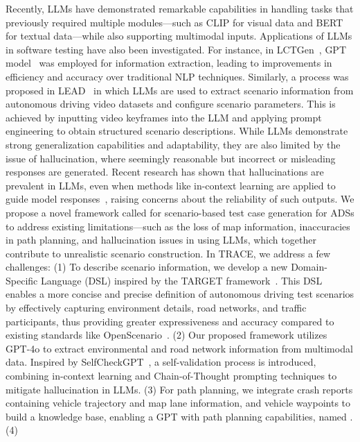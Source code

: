 Recently, LLMs have demonstrated remarkable capabilities in handling tasks that previously required multiple modules—such as CLIP for visual data and BERT for textual data—while also supporting multimodal inputs. Applications of LLMs in software testing have also been investigated. For instance, in LCTGen~\cite{tan2023language}, GPT model~\cite{brown2020language} was employed for information extraction, leading to improvements in efficiency and accuracy over traditional NLP techniques. Similarly, a process was proposed in LEAD~\cite{tian2024llm} in which LLMs are used to extract scenario information from autonomous driving video datasets and configure scenario parameters. This is achieved by inputting video keyframes into the LLM and applying prompt engineering to obtain structured scenario descriptions. While LLMs demonstrate strong generalization capabilities and adaptability, they are also limited by the issue of hallucination, where seemingly reasonable but incorrect or misleading responses are generated. Recent research has shown that hallucinations are prevalent in LLMs, even when methods like in-context learning are applied to guide model responses~\cite{huang2023survey}, raising concerns about the reliability of such outputs.
We propose a novel framework called \textbf{{\tool}} for scenario-based test case generation for ADSs to address existing limitations—such as the loss of map information, inaccuracies in path planning, and hallucination issues in using LLMs, which together contribute to unrealistic scenario construction.
In TRACE, we address a few challenges: (1) To describe scenario information, we develop a new Domain-Specific Language (DSL) inspired by the TARGET framework~\cite{deng2023targetautomatedscenariogeneration}. This DSL enables a more concise and precise definition of autonomous driving test scenarios by effectively capturing environment details, road networks, and traffic participants, thus providing greater expressiveness and accuracy compared to existing standards like OpenScenario~\cite{ASAM2021}. (2) Our proposed framework utilizes GPT-4o to extract environmental and road network information from multimodal data. Inspired by SelfCheckGPT~\cite{manakul2023selfcheckgpt}, a self-validation process is introduced, combining in-context learning and Chain-of-Thought prompting techniques to mitigate hallucination in LLMs. (3) For path planning, we integrate crash reports containing vehicle trajectory and map lane information, and vehicle waypoints to build a knowledge base, enabling a GPT with path planning capabilities, named {\tooltwo}. (4) %
